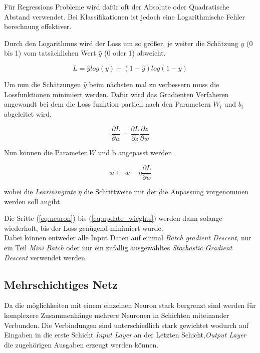Für Regressions Probleme wird dafür oft der Absolute oder Quadratische Abstand
verwendet. Bei Klassifikationen ist jedoch eine Logarithmische Fehler berechnung 
effektiver.

Durch den Logarithmus wird der Loss um so größer, je weiter die Schätzung $y$ (0 bis 1) vom 
tatsächlichen Wert $\hat{y}$ (0 oder 1) abweicht. 

\begin{equation}
    \label{eq:crossentropy}
    L = \hat{y}log(y) + (1 - \hat{y})log(1 - y)
\end{equation}


Um nun die Schätzungen $\hat{y}$ beim nächsten mal zu verbessern muss die 
Lossfunktionen minimiert werden. Dafür wird das Gradienten Verfaheren angewandt 
bei dem die Loss funktion partiell nach den Parametern $W_{i}$ und $b_{i}$ 
abgeleitet wird.

\begin{equation}
    \label{eq:grad}
    \frac{\partial L}{\partial w} = \frac{\partial L}{\partial z}\frac{\partial z}{\partial w}
\end{equation}

Nun können die Parameter $W$ und b angepasst werden.

\begin{equation}
    \label{eq:update_wieghts}
    w  \leftarrow w - \eta \frac{\partial L}{\partial w}
\end{equation}

wobei die \textit{Leariningrate} $\eta$ die Schrittweite mit der die Anpassung vorgenommen
werden soll angibt.

Die Sritte (\ref{eq:neuron}) bis (\ref{eq:update_wieghts}) werden dann solange wiederholt, 
bis der Loss genügend minimiert wurde.
\\
Dabei können entweder alle Input Daten auf einmal \textit{Batch 
gradient Descent}, nur ein Teil \textit{Mini Batch} oder nur 
ein zufallig ausgewähltes \textit{Stochastic Gradient 
Descent} verwendet werden.



\subsection{Mehrschichtiges Netz}\label{subsec:mlp}


Da die möglichkeiten mit einem einzelnen Neuron stark bergrenzt sind 
werden für komplexere Zusammenhänge mehrere Neuronen in Schichten 
miteinander Verbunden. Die Verbindungen sind unterschiedlich stark 
gewichtet wodurch auf Eingaben in die erste Schicht \textit{Input Layer} 
an der Letzten Schicht,\textit{Output Layer} die zugehörigen Ausgaben 
erzeugt werden können. 

